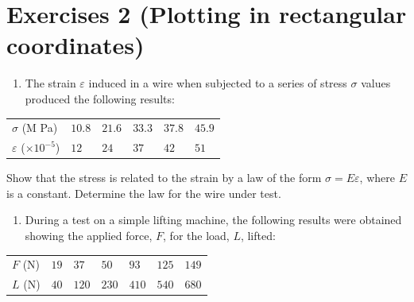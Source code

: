 \documentclass[
  12pt,
  oneside]{book}
\providecommand{\tightlist}{%
  \setlength{\itemsep}{0pt}\setlength{\parskip}{0pt}}
\theoremstyle{definition}
\theoremstyle{definition}
\theoremstyle{definition}
\theoremstyle{definition}
\theoremstyle{remark}
\begin{document}
\chapter*{Exercises 2 (Plotting in rectangular coordinates)}\label{exercises-2-plotting-in-rectangular-coordinates}

\begin{enumerate}
\def\labelenumi{\arabic{enumi}.}
\tightlist
\item
  The strain \(\varepsilon\) induced in a wire when subjected to a series of stress \(\sigma\) values produced the following results:
\end{enumerate}

\begin{longtable}[]{@{}
  >{\raggedright\arraybackslash}p{}
  >{\raggedright\arraybackslash}p{}
  >{\raggedright\arraybackslash}p{}
  >{\raggedright\arraybackslash}p{}
  >{\raggedright\arraybackslash}p{}
  >{\raggedright\arraybackslash}p{}@{}}
\toprule\noalign{}
\endhead
\bottomrule\noalign{}
\endlastfoot
\(\sigma\) (M Pa) & \(10.8\) & \(21.6\) & \(33.3\) & \(37.8\) & \(45.9\) \\
\(\varepsilon\) (\(\times 10^{-5}\)) & \(12\) & \(24\) & \(37\) & \(42\) & \(51\) \\
\end{longtable}

Show that the stress is related to the strain by a law of the form \(\sigma=E\varepsilon\), where \(E\) is a constant.
Determine the law for the wire under test.

\begin{enumerate}
\def\labelenumi{\arabic{enumi}.}
\setcounter{enumi}{1}
\tightlist
\item
  During a test on a simple lifting machine, the following results were obtained showing the
  applied force, \(F\), for the load, \(L\), lifted:
\end{enumerate}

\begin{longtable}[]{@{}
  >{\raggedright\arraybackslash}p{}
  >{\raggedright\arraybackslash}p{}
  >{\raggedright\arraybackslash}p{}
  >{\raggedright\arraybackslash}p{}
  >{\raggedright\arraybackslash}p{}
  >{\raggedright\arraybackslash}p{}
  >{\raggedright\arraybackslash}p{}@{}}
\toprule\noalign{}
\endhead
\bottomrule\noalign{}
\endlastfoot
\(F\) (N) & \(19\) & \(37\) & \(50\) & \(93\) & \(125\) & \(149\) \\
\(L\) (N) & \(40\) & \(120\) & \(230\) & \(410\) & \(540\) & \(680\) \\
\end{longtable}
\end{document}
